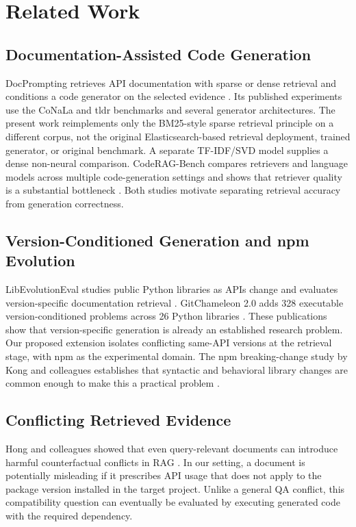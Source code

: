 \documentclass[conference]{IEEEtran}
\begin{document}
\section{Related Work}
\subsection{Documentation-Assisted Code Generation}
DocPrompting retrieves API documentation with sparse or dense retrieval and conditions a code generator on the selected evidence \cite{docprompting}. Its published experiments use the CoNaLa and tldr benchmarks and several generator architectures. The present work reimplements only the BM25-style sparse retrieval principle on a different corpus, not the original Elasticsearch-based retrieval deployment, trained generator, or original benchmark. A separate TF-IDF/SVD model supplies a dense non-neural comparison. CodeRAG-Bench compares retrievers and language models across multiple code-generation settings and shows that retriever quality is a substantial bottleneck \cite{coderag}. Both studies motivate separating retrieval accuracy from generation correctness.

\subsection{Version-Conditioned Generation and npm Evolution}
LibEvolutionEval studies public Python libraries as APIs change and evaluates version-specific documentation retrieval \cite{libevolution}. GitChameleon 2.0 adds 328 executable version-conditioned problems across 26 Python libraries \cite{gitchameleon}. These publications show that version-specific generation is already an established research problem. Our proposed extension isolates conflicting same-API versions at the retrieval stage, with npm as the experimental domain. The npm breaking-change study by Kong and colleagues establishes that syntactic and behavioral library changes are common enough to make this a practical problem \cite{npmchanges}.

\subsection{Conflicting Retrieved Evidence}
Hong and colleagues showed that even query-relevant documents can introduce harmful counterfactual conflicts in RAG \cite{gullible}. In our setting, a document is potentially misleading if it prescribes API usage that does not apply to the package version installed in the target project. Unlike a general QA conflict, this compatibility question can eventually be evaluated by executing generated code with the required dependency.
\end{document}
